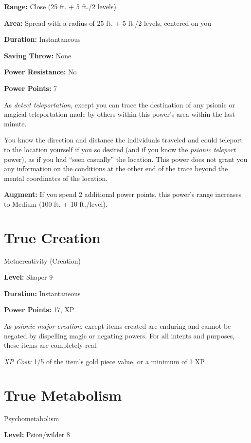 \documentclass{article}
\begin{document}
\textbf{Range:} Close (25 ft. + 5 ft./2 levels)

\textbf{Area:} Spread with a radius of 25 ft. + 5 ft./2 levels, centered on you

\textbf{Duration:} Instantaneous

\textbf{Saving Throw:} None

\textbf{Power Resistance:} No

\textbf{Power Points:} 7

As \textit{detect teleportation}, except you can trace the destination of any psionic 
or magical teleportation made by others within this power's area within the last 
minute.

You know the direction and distance the individuals traveled and could teleport 
to the location yourself if you so desired (and if you know the \textit{psionic 
teleport }power), as if you had ``seen casually'' the location. This power does 
not grant you any information on the conditions at the other end of the trace beyond 
the mental coordinates of the location.

\textbf{Augment:} If you spend 2 additional power points, this power's range increases 
to Medium (100 ft. + 10 ft./level).

\vspace{12pt}
\section*{True Creation}

Metacreativity (Creation)

\textbf{Level:} Shaper 9

\textbf{Duration:} Instantaneous

\textbf{Power Points:} 17, XP

As \textit{psionic major creation}, except items created are enduring and cannot 
be negated by dispelling magic or negating powers. For all intents and purposes, 
these items are completely real.

\textit{XP Cost: }1/5 of the item's gold piece value, or a minimum of 1 XP.

\vspace{12pt}
\section*{True Metabolism}

Psychometabolism

\textbf{Level:} Psion/wilder 8
\end{document}
